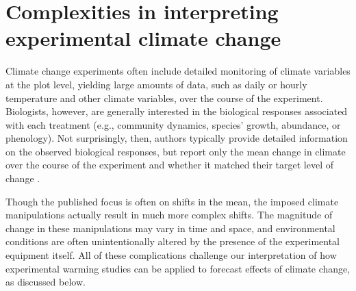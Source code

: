 \documentclass{article}
\begin{document}
\section* {Complexities in interpreting experimental climate change} 
Climate change experiments often include detailed monitoring of climate variables at the plot level, yielding large amounts of data, such as daily or hourly temperature and other climate variables, over the course of the experiment. Biologists, however, are generally interested in the biological responses associated with each treatment (e.g., community dynamics, species' growth, abundance, or phenology). Not surprisingly, then, authors typically provide detailed information on the observed biological responses, but report only the mean change in climate over the course of the experiment and whether it matched their target level of change \citep[e.g.][]{price1998,clark2014a,clark2014b,rollinson2012}. 
\par Though the published focus is often on shifts in the mean, the imposed climate manipulations actually result in much more complex shifts. The magnitude of change in these manipulations may vary in time and space, and environmental conditions are often unintentionally altered by the presence of the experimental equipment itself. All of these complications challenge our interpretation of how experimental warming studies can be applied to forecast effects of climate change, as discussed below.
\end{document}
